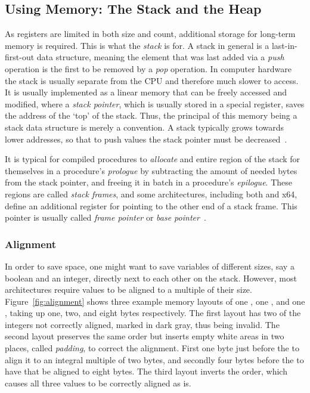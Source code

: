 \subsection{Using Memory: The Stack and the Heap}

As registers are limited in both size and count, additional storage for long-term memory is required.
This is what the \emph{stack} is for.
A stack in general is a last-in-first-out data structure, meaning the element that was last added via a \emph{push} operation is the first to be removed by a \emph{pop} operation.
In computer hardware the stack is usually separate from the CPU and therefore much slower to access.
It is usually implemented as a linear memory that can be freely accessed and modified, where a \emph{stack pointer}, which is usually stored in a special register, saves the address of the `top' of the stack.
Thus, the principal of this memory being a stack data structure is merely a convention.
A stack typically grows towards lower addresses, so that to push values the stack pointer must be decreased~\cite[pp.~68,99,100]{Patterson2017-zq}.

It is typical for compiled procedures to \emph{allocate} and entire region of the stack for themselves in a procedure's \emph{prologue} by subtracting the amount of needed bytes from the stack pointer, and freeing it in batch in a procedure's \emph{epilogue}.
These regions are called \emph{stack frames}, and some architectures, including both \riscv{} and x64, define an additional register for pointing to the other end of a stack frame.
This pointer is usually called \emph{frame pointer} or \emph{base pointer}~\cite[p.~94]{Waldron1998}.

\subsubsection{Alignment}\label{sec:alignment}

In order to save space, one might want to save variables of different sizes, say a boolean and an integer, directly next to each other on the stack.
However, most architectures require values to be aligned to a multiple of their size.
Figure~\ref{fig:alignment} shows three example memory layouts of one , one , and one , taking up one, two, and eight bytes respectively.
The first layout has two of the integers not correctly aligned, marked in dark gray, thus being invalid.
The second layout preserves the same order but inserts empty white areas in two places, called \emph{padding}, to correct the alignment.
First one byte just before the  to align it to an integral multiple of two bytes, and secondly four bytes before the  to have that be aligned to eight bytes.
The third layout inverts the order, which causes all three values to be correctly aligned as is.

